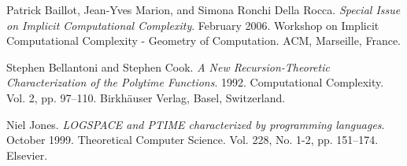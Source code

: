 
\begin{thebibliography}{9} %


Patrick Baillot, Jean-Yves Marion, and Simona Ronchi Della Rocca. \emph{Special
Issue on Implicit Computational Complexity}. February 2006. Workshop on
Implicit Computational Complexity - Geometry of Computation. ACM, Marseille,
France.


Stephen Bellantoni and Stephen Cook. \emph{A New Recursion-Theoretic
Characterization of the Polytime Functions}. 1992. Computational Complexity.
Vol. 2, pp. 97--110. Birkh\"auser Verlag, Basel, Switzerland.


Niel Jones. \emph{LOGSPACE and PTIME characterized by programming languages}.
October 1999. Theoretical Computer Science. Vol. 228, No. 1-2, pp. 151--174. Elsevier.

\end{thebibliography}
